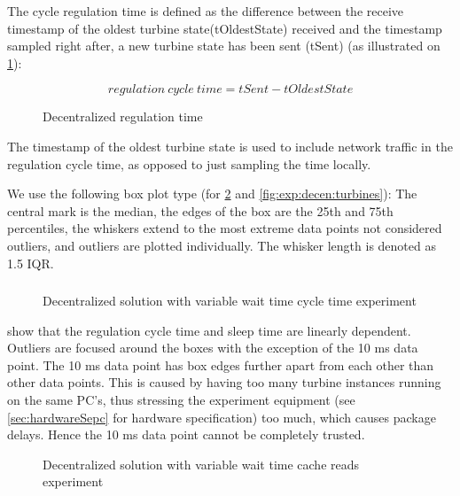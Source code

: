 \label{sec:exp:performance}
The cycle regulation time is defined as the difference between the receive timestamp of the oldest turbine state(tOldestState) received and the timestamp sampled right after, a new turbine state has been sent (tSent) (as illustrated on \cref{fig:timingDecentral}):

$$regulation~cycle~time=tSent-tOldestState$$

\begin{figure}[b]
	
	\caption{Decentralized regulation time}
	\label{fig:timingDecentral}
\end{figure}

The timestamp of the oldest turbine state is used to include network traffic in the regulation cycle time, as opposed to just sampling the time locally.

We use the following box plot type (for \cref{fig:exp:decen:sleep} and \cref{fig:exp:decen:turbines}): The central mark is the median, the edges of the box are the 25th and 75th percentiles, the whiskers extend to the most extreme data points not considered outliers, and outliers are plotted individually. The whisker length is denoted as 1.5 IQR. 

\subsubsection{}

\begin{figure}[h!]
	\centering
%	
	
	\caption{Decentralized solution with variable wait time cycle time experiment}
	\label{fig:exp:decen:sleep}
\end{figure}

 show that the regulation cycle time and sleep time are linearly dependent. Outliers are focused around the boxes with the exception of the 10 ms data point. The 10 ms data point has box edges further apart from each other than other data points. This is caused by having too many turbine instances running on the same PC's, thus stressing the experiment equipment (see \cref{sec:hardwareSepc} for hardware specification) too much, which causes package delays. Hence the 10 ms data point cannot be completely trusted.

\begin{figure}[h!]
	\centering
	
	\caption{Decentralized solution with variable wait time cache reads experiment}
	\label{fig:exp:decen:sleep-cache}
\end{figure}

